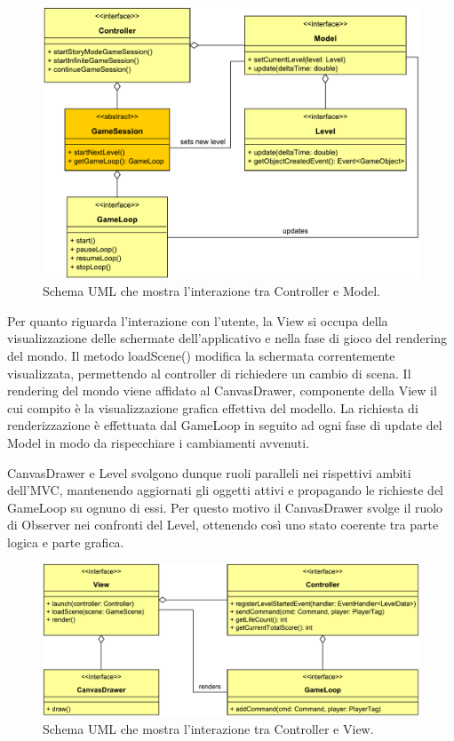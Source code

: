 \documentclass[a4paper,12pt]{report}
\begin{document}
\begin{figure}[H]
\includegraphics[width=\linewidth]{img/model_controller}
\caption{Schema UML che mostra l'interazione tra Controller e Model.}
\label{img:model_controller}
\end{figure}

Per quanto riguarda l'interazione con l'utente, la View si occupa della visualizzazione delle schermate dell'applicativo e nella fase di gioco del rendering del mondo.
Il metodo loadScene() modifica la schermata correntemente visualizzata, permettendo al controller di richiedere un cambio di scena.
Il rendering del mondo viene affidato al CanvasDrawer, componente della View il cui compito è la visualizzazione grafica effettiva del modello.
La richiesta di renderizzazione è effettuata dal GameLoop in seguito ad ogni fase di update del Model in modo da rispecchiare i cambiamenti avvenuti.

CanvasDrawer e Level svolgono dunque ruoli paralleli nei rispettivi ambiti dell'MVC, mantenendo aggiornati gli oggetti attivi e propagando le richieste del GameLoop su ognuno di essi.
Per questo motivo il CanvasDrawer svolge il ruolo di Observer nei confronti del Level, ottenendo così uno stato coerente tra parte logica e parte grafica.

\begin{figure}[H]
\includegraphics[width=\linewidth]{img/controller_view}
\caption{Schema UML che mostra l'interazione tra Controller e View.}
\label{img:controller_view}
\end{figure}
\end{document}

